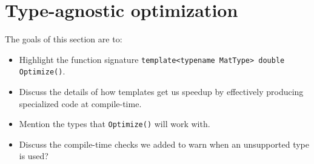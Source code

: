 \section{Type-agnostic optimization}
\label{sec:templated_optimize}

The goals of this section are to:

\begin{itemize}
  \item Highlight the function signature {\tt template<typename MatType> double
Optimize()}.

  \item Discuss the details of how templates get us speedup by effectively
producing specialized code at compile-time.

  \item Mention the types that {\tt Optimize()} will work with.

  \item Discuss the compile-time checks we added to warn when an unsupported
type is used?
\end{itemize}
